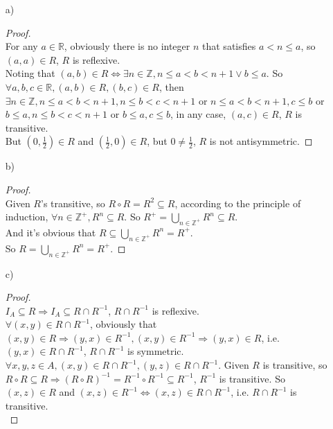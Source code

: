 \documentclass{article}
\begin{document}
\begin{itemize}
    \item [a)]
    \begin{proof}\quad \\
        For any $a \in \mathbb{R}$, obviously there is no integer $n$ that satisfies $a < n \leqslant a$, so $(a, a) \in R$, $R$ is reflexive. \\
        Noting that $(a, b) \in R \Leftrightarrow \exists n \in \mathbb{Z}, n \leqslant a < b < n + 1 \lor b \leqslant a$. So $\forall a, b, c \in \mathbb{R}, (a, b) \in R, (b, c) \in R$, then $\exists n \in \mathbb{Z}, n \leqslant a < b < n + 1, n \leqslant b < c < n + 1 $ or $n \leqslant a < b < n + 1, c \leqslant b $ or $ b \leqslant a, n \leqslant b < c < n + 1$ or $b \leqslant a, c \leqslant b$, in any case, $(a, c) \in R$, $R$ is transitive. \\
        But $(0, \frac{1}{2}) \in R$ and $(\frac{1}{2}, 0) \in R$, but $0 \neq \frac{1}{2}$, $R$ is not antisymmetric.
    \end{proof} 
    \item [b)] 
    \begin{proof}\quad \\
        Given $R$'s transitive, so $R \circ R = R^2 \subseteq R$, according to the principle of induction, $\forall n \in \mathbb{Z}^+, R^n \subseteq R$. So $R^+ = \bigcup_{n \in \mathbb{Z}^+}R^n \subseteq R$. \\
        And it's obvious that $R \subseteq \bigcup_{n \in \mathbb{Z}^+}R^n = R^+$. \\
        So $R = \bigcup_{n \in \mathbb{Z}^+}R^n = R^+$.
    \end{proof}
    \item [c)]
    \begin{proof} \quad \\
        $I_A \subseteq R \Rightarrow I_A \subseteq R \cap R^{-1}$, $R \cap R^{-1}$ is reflexive. \\
        $\forall (x, y) \in R \cap R^{-1}$, obviously that $(x, y) \in R \Rightarrow (y, x) \in R^{-1}, (x, y) \in R^{-1} \Rightarrow (y, x) \in R$, i.e. $(y, x) \in R \cap R^{-1}$, $R \cap R^{-1}$ is symmetric. \\
        $\forall x, y, z \in A, (x, y) \in R \cap R^{-1}, (y, z) \in R \cap R^{-1}$. Given $R$ is transitive, so $R \circ R \subseteq R \Rightarrow (R \circ R)^{-1} = R^{-1} \circ R^{-1} \subseteq R^{-1}$, $R^{-1}$ is transitive. So $(x, z) \in R$ and $(x, z) \in R^{-1} \Leftrightarrow (x, z) \in R \cap R^{-1}$, i.e. $R \cap R^{-1}$ is transitive. \\

\end{proof}
\end{itemize}
\end{document}
